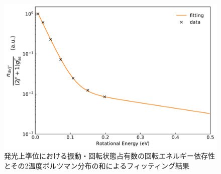\begin{figure}
    \centering
    \includegraphics[width=15cm]{pictures/upper-two-fitting.pdf}
    \caption[発光上準位における振動・回転状態占有数の回転エネルギー依存性とその2温度ボルツマン分布の和によるフィッティング結果]{発光上準位における振動・回転状態占有数の回転エネルギー依存性とその2温度ボルツマン分布の和によるフィッティング結果}
    \label{fig:upper-two-fitting}
\end{figure}
